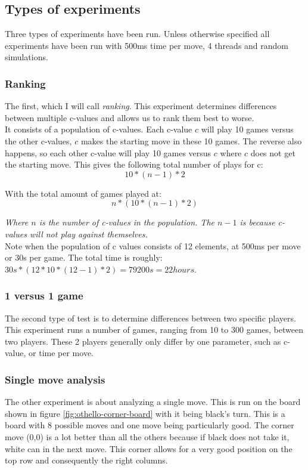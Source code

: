 \documentclass[11pt,a4paper]{article}
\begin{document}
\subsection{Types of experiments}
Three types of experiments have been run. Unless otherwise specified all experiments have been run with 500ms time per move, 4 threads and random simulations.

\subsubsection{Ranking} The first, which I will call \textit{ranking}. This experiment determines differences between multiple c-values and allows us to rank them best to worse.\\

It consists of a population of c-values. Each c-value $c$ will play 10 games versus the other c-values, $c$ makes the starting move in these 10 games. The reverse also happens, so each other c-value will play 10 games versus $c$ where $c$ does not get the starting move. This gives the following total number of plays for c:
\[
   10 * (n-1) * 2
\]

With the total amount of games played at: 
\[
   n * (10 * (n-1) * 2)
\]

\textit{Where $n$ is the number of c-values in the population. The $n-1$ is because c-values will not play against themselves.}\\

Note when the population of c values consists of 12 elements, at 500ms per move or 30s per game. The total time is roughly: $30s * (12 * 10 * (12-1) * 2) =  79200s = 22 hours$.

\subsubsection{1 versus 1 game}
The second type of test is to determine differences between two specific players. This experiment runs a number of games, ranging from 10 to 300 games, between two players. These 2 players generally only differ by one parameter, such as c-value, or time per move.
\subsubsection{Single move analysis}
The other experiment is about analyzing a single move. This is run on the board shown in figure \ref{fig:othello-corner-board} with it being black's turn. This is a board with 8 possible moves and one move being particularly good. The corner move (0,0) is a lot better than all the others because if black does not take it, white can in the next move. This corner allows for a very good position on the top row and consequently the right columns.\\
\end{document}
